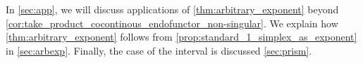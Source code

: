 In \cref{sec:app}, we will discuss applications of \cref{thm:arbitrary_exponent} beyond \cref{cor:take_product_cocontinous_endofunctor_non-singular}. We explain how \cref{thm:arbitrary_exponent} follows from \cref{prop:standard_1_simplex_as_exponent} in \cref{sec:arbexp}. Finally, the case of the interval is discussed \cref{sec:prism}.



